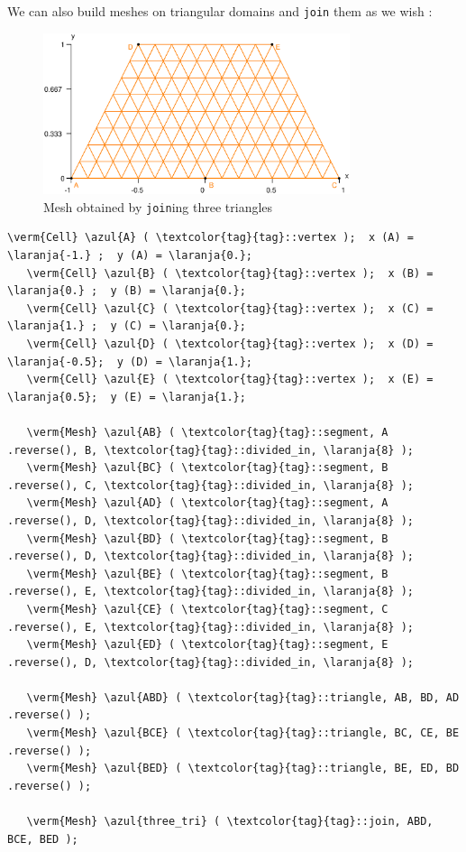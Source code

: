 We can also build meshes on triangular domains and {\small\tt join} them as we wish :

\begin{figure}[ht] \centering
  \includegraphics[width=90mm]{three-tri}
  \caption{Mesh obtained by {\small\tt join}ing three triangles}
  \label{\numb section 1.\numb fig 7}
\end{figure}

\begin{Verbatim}[commandchars=\\\{\},formatcom=\small\tt,frame=single,
   label=parag-\ref{\numb section 1.\numb parag 5}.cpp,rulecolor=\color{coment},
   baselinestretch=0.94,framesep=2mm]
   \verm{Cell} \azul{A} ( \textcolor{tag}{tag}::vertex );  x (A) = \laranja{-1.} ;  y (A) = \laranja{0.};
   \verm{Cell} \azul{B} ( \textcolor{tag}{tag}::vertex );  x (B) =  \laranja{0.} ;  y (B) = \laranja{0.};
   \verm{Cell} \azul{C} ( \textcolor{tag}{tag}::vertex );  x (C) =  \laranja{1.} ;  y (C) = \laranja{0.};
   \verm{Cell} \azul{D} ( \textcolor{tag}{tag}::vertex );  x (D) = \laranja{-0.5};  y (D) = \laranja{1.};
   \verm{Cell} \azul{E} ( \textcolor{tag}{tag}::vertex );  x (E) =  \laranja{0.5};  y (E) = \laranja{1.};

   \verm{Mesh} \azul{AB} ( \textcolor{tag}{tag}::segment, A .reverse(), B, \textcolor{tag}{tag}::divided_in, \laranja{8} );
   \verm{Mesh} \azul{BC} ( \textcolor{tag}{tag}::segment, B .reverse(), C, \textcolor{tag}{tag}::divided_in, \laranja{8} );
   \verm{Mesh} \azul{AD} ( \textcolor{tag}{tag}::segment, A .reverse(), D, \textcolor{tag}{tag}::divided_in, \laranja{8} );
   \verm{Mesh} \azul{BD} ( \textcolor{tag}{tag}::segment, B .reverse(), D, \textcolor{tag}{tag}::divided_in, \laranja{8} );
   \verm{Mesh} \azul{BE} ( \textcolor{tag}{tag}::segment, B .reverse(), E, \textcolor{tag}{tag}::divided_in, \laranja{8} );
   \verm{Mesh} \azul{CE} ( \textcolor{tag}{tag}::segment, C .reverse(), E, \textcolor{tag}{tag}::divided_in, \laranja{8} );
   \verm{Mesh} \azul{ED} ( \textcolor{tag}{tag}::segment, E .reverse(), D, \textcolor{tag}{tag}::divided_in, \laranja{8} );

   \verm{Mesh} \azul{ABD} ( \textcolor{tag}{tag}::triangle, AB, BD, AD .reverse() );
   \verm{Mesh} \azul{BCE} ( \textcolor{tag}{tag}::triangle, BC, CE, BE .reverse() );
   \verm{Mesh} \azul{BED} ( \textcolor{tag}{tag}::triangle, BE, ED, BD .reverse() );

   \verm{Mesh} \azul{three_tri} ( \textcolor{tag}{tag}::join, ABD, BCE, BED );
\end{Verbatim}


